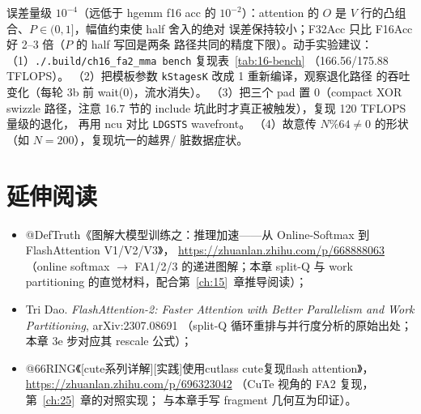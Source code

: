 误差量级 $10^{-4}$（远低于 hgemm f16 acc 的 $10^{-2}$）：attention
的 $O$ 是 $V$ 行的凸组合、$P\in(0,1]$，幅值约束使 half 舍入的绝对
误差保持较小；F32Acc 只比 F16Acc 好 2--3 倍（$P$ 的 half 写回是两条
路径共同的精度下限）。动手实验建议：
（1）\texttt{.\allowbreak{}/\allowbreak{}.\allowbreak{}build/\allowbreak{}ch16\_\allowbreak{}fa2\_\allowbreak{}mma bench} 复现表~\ref{tab:16-bench}
（166.56/175.88 TFLOPS）。
（2）把模板参数 \texttt{kStagesK} 改成 1 重新编译，观察退化路径
的吞吐变化（每轮 3b 前 wait(0)，流水消失）。
（3）把三个 pad 置 0（compact XOR swizzle 路径，注意 16.7 节的
include 坑此时才真正被触发），复现 120 TFLOPS 量级的退化，
再用 ncu 对比 \texttt{LDGSTS} wavefront。
（4）故意传 $N\%64\neq0$ 的形状（如 $N{=}200$），复现坑一的越界/
脏数据症状。

\section*{延伸阅读}

\begin{itemize}
  \item @DefTruth《图解大模型训练之：推理加速——从 Online-Softmax 到
        FlashAttention V1/V2/V3》，
        \url{https://zhuanlan.zhihu.com/p/668888063}
        （online softmax $\to$ FA1/2/3 的递进图解；本章 split-Q 与
        work partitioning 的直觉材料，配合第~\ref{ch:15}~章推导阅读）；
  \item Tri Dao. \emph{FlashAttention-2: Faster Attention with Better
        Parallelism and Work Partitioning}, arXiv:2307.08691
        （split-Q 循环重排与并行度分析的原始出处；本章 3e 步对应其
        rescale 公式）；
  \item @66RING《[cute系列详解][实践]使用cutlass cute复现flash attention》，
        \url{https://zhuanlan.zhihu.com/p/696323042}
        （CuTe 视角的 FA2 复现，第~\ref{ch:25}~章的对照实现；
        与本章手写 fragment 几何互为印证）。
\end{itemize}
